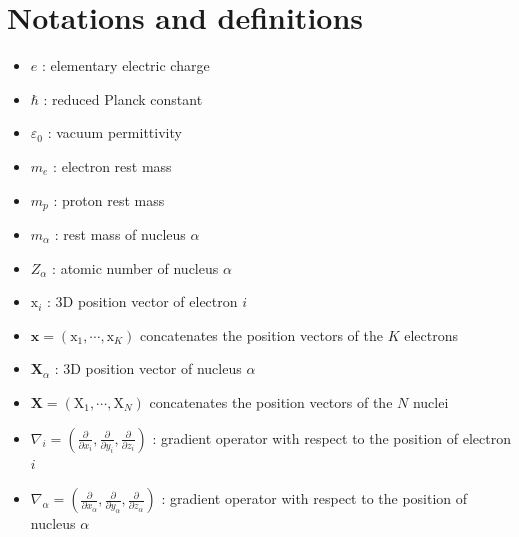 \documentclass[11pt,a4paper]{article}
\begin{document}
\section{Notations and definitions}
\begin{itemize}[label={}, leftmargin=*, itemsep=3pt, parsep=3pt]
    \item $e$ : elementary electric charge
    \item $\hbar$ : reduced Planck constant
    \item $\varepsilon_0$ : vacuum permittivity
    \item $m_e$ : electron rest mass
    \item $m_p$ : proton rest mass
    \item $m_\alpha$ : rest mass of nucleus $\alpha$
    \item $Z_\alpha$ : atomic number of nucleus $\alpha$
    \item $\mathrm{x}_i$ : 3D position vector of electron $i$
    \item $\mathbf{x}=(\mathrm{x}_1,\cdots,\mathrm{x}_K)$ concatenates the position vectors of the $K$ electrons
    \item $\mathbf{X}_\alpha$ : 3D position vector of nucleus $\alpha$
    \item $\mathbf{X}=(\mathrm{X}_1,\cdots,\mathrm{X}_N)$ concatenates the position vectors of the $N$ nuclei
    \item $\nabla_i = \left(\frac{\partial}{\partial x_i}, \frac{\partial}{\partial y_i}, \frac{\partial}{\partial z_i}\right)$ : gradient operator with respect to the position of electron $i$
    \item $\nabla_\alpha = \left(\frac{\partial}{\partial x_\alpha}, \frac{\partial}{\partial y_\alpha}, \frac{\partial}{\partial z_\alpha}\right)$ : gradient operator with respect to the position of nucleus $\alpha$
\end{itemize}
\end{document}
